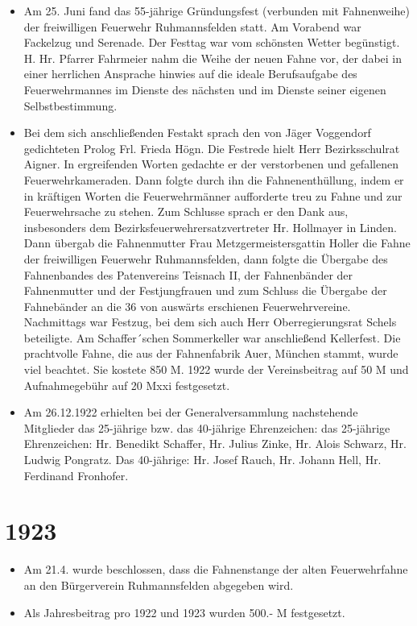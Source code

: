 \documentclass[12pt,a4paper]{book}
\begin{document}
\begin{itemize}
\item Am 25. Juni fand das 55-jährige Gründungsfest (verbunden mit Fahnenweihe)
der freiwilligen Feuerwehr Ruhmannsfelden statt. Am Vorabend war Fackelzug und
Serenade. Der Festtag war vom schönsten Wetter begünstigt. H. Hr. Pfarrer
Fahrmeier nahm die Weihe der neuen Fahne vor, der dabei in einer herrlichen
Ansprache hinwies auf die ideale Berufsaufgabe des Feuerwehrmannes im Dienste
des nächsten und im Dienste seiner eigenen Selbstbestimmung.

\item Bei dem sich anschließenden Festakt sprach den von Jäger Voggendorf
gedichteten Prolog Frl. Frieda Högn. Die Festrede hielt Herr Bezirksschulrat
Aigner. In ergreifenden Worten gedachte er der verstorbenen und gefallenen
Feuerwehrkameraden. Dann folgte durch ihn die Fahnenenthüllung, indem er in
kräftigen Worten die Feuerwehrmänner aufforderte treu zu Fahne und zur
Feuerwehrsache zu stehen. Zum Schlusse sprach er den Dank aus, insbesonders dem
Bezirksfeuerwehrersatzvertreter Hr. Hollmayer in Linden. Dann übergab die
Fahnenmutter Frau Metzgermeistersgattin Holler die Fahne der freiwilligen
Feuerwehr Ruhmannsfelden, dann folgte die Übergabe des Fahnenbandes des
Patenvereins Teisnach II, der Fahnenbänder der Fahnenmutter und der
Festjungfrauen und zum Schluss die Übergabe der Fahnebänder an die 36 von
auswärts erschienen Feuerwehrvereine. Nachmittags war Festzug, bei dem sich auch
Herr Oberregierungsrat Schels beteiligte. Am Schaffer´schen Sommerkeller war
anschließend Kellerfest. Die prachtvolle Fahne, die aus der Fahnenfabrik Auer,
München stammt, wurde viel beachtet. Sie kostete 850 M. 1922 wurde der
Vereinsbeitrag auf 50 M und Aufnahmegebühr auf 20 Mxxi festgesetzt.

\item Am 26.12.1922 erhielten bei der Generalversammlung nachstehende Mitglieder
das 25-jährige bzw. das 40-jährige Ehrenzeichen: das 25-jährige Ehrenzeichen:
Hr. Benedikt Schaffer, Hr. Julius Zinke, Hr. Alois Schwarz, Hr. Ludwig Pongratz.
Das 40-jährige: Hr. Josef Rauch, Hr. Johann Hell, Hr. Ferdinand Fronhofer.
\end{itemize}

\section*{1923}

\begin{itemize}
\item Am 21.4. wurde beschlossen, dass die Fahnenstange der alten Feuerwehrfahne
an den Bürgerverein Ruhmannsfelden abgegeben wird.

\item Als Jahresbeitrag pro 1922 und 1923 wurden 500.- M festgesetzt.
\end{itemize}
\end{document}
